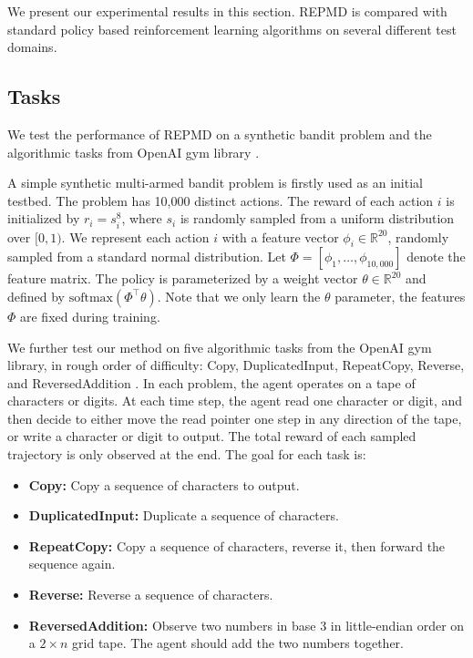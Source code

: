 
We present our experimental results in this section. REPMD is compared with standard policy based reinforcement learning algorithms on several different test domains.

\subsection{Tasks}
We test the performance of REPMD on a synthetic bandit problem and the algorithmic tasks from OpenAI gym library \citep{brockman2016openai}.  

A simple synthetic multi-armed bandit problem is firstly used as an initial testbed.
The problem has 10,000 distinct actions. The reward of each action $i$ is initialized by $r_i = s_i^{8}$, where $s_i$ is randomly sampled from a uniform distribution over $[0,1)$. We represent each action $i$ with a feature vector $\phi_i\in \mathbb{R}^{20}$, randomly sampled from a standard normal distribution. Let $\Phi=[\phi_1,\dots,\phi_{10,000}]$ denote the feature matrix. The policy is parameterized by a weight vector $\theta\in  \mathbb{R}^{20}$ and  defined by $\text{softmax}(\Phi^{\top}\theta)$. Note that we only learn the $\theta$ parameter, the features $\Phi$ are fixed during training. 


We further test our method on five algorithmic tasks from the OpenAI gym library, in rough order of difficulty: Copy, DuplicatedInput, RepeatCopy, Reverse, and ReversedAddition \citep{brockman2016openai}. In each problem, the agent operates on a tape of characters or digits. At each time step, the agent read one character or digit, and then decide to either move the read pointer one step in any direction of the tape, or write a character or digit to output. The total reward of each sampled trajectory is only observed at the end. The goal for each task is:
\begin{itemize}
\item \textbf{Copy:} Copy a sequence of characters to output. 
\item \textbf{DuplicatedInput:} Duplicate a sequence of characters.
\item \textbf{RepeatCopy:} Copy a sequence of characters, reverse it, then forward the sequence again. 
\item \textbf{Reverse:} Reverse a sequence of characters.
\item \textbf{ReversedAddition:} Observe two numbers in base 3 in little-endian order on a $2\times n$ grid tape. The agent should add the two numbers together. 
\end{itemize}



